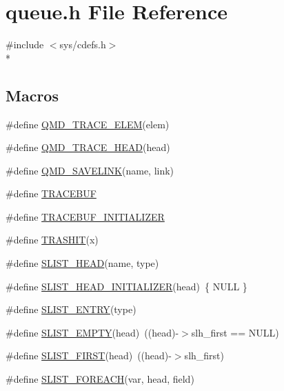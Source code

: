 \section{queue.\-h File Reference}
\label{queue_8h}
{\ttfamily \#include $<$sys/cdefs.\-h$>$}\\*
\subsection*{Macros}
\begin{DoxyCompactItemize}
\item 
\#define \hyperlink{queue_8h_a990f2617ebc37cd79c332e24ce7e4a88}{Q\-M\-D\-\_\-\-T\-R\-A\-C\-E\-\_\-\-E\-L\-E\-M}(elem)
\item 
\#define \hyperlink{queue_8h_af8813e6512e6ac86e6b598241b1bf020}{Q\-M\-D\-\_\-\-T\-R\-A\-C\-E\-\_\-\-H\-E\-A\-D}(head)
\item 
\#define \hyperlink{queue_8h_a96671a8f87ff87543b3b0b671a274a1c}{Q\-M\-D\-\_\-\-S\-A\-V\-E\-L\-I\-N\-K}(name, link)
\item 
\#define \hyperlink{queue_8h_a743488648fbd29bf4cf1addf004f43ef}{T\-R\-A\-C\-E\-B\-U\-F}
\item 
\#define \hyperlink{queue_8h_a0397af84b4a238c2b678721a88b6eccc}{T\-R\-A\-C\-E\-B\-U\-F\-\_\-\-I\-N\-I\-T\-I\-A\-L\-I\-Z\-E\-R}
\item 
\#define \hyperlink{queue_8h_adee7bf054da0ade68bb853732c665a2b}{T\-R\-A\-S\-H\-I\-T}(x)
\item 
\#define \hyperlink{queue_8h_a8224e40ea764bc857bab6f6d9c357dd9}{S\-L\-I\-S\-T\-\_\-\-H\-E\-A\-D}(name, type)
\item 
\#define \hyperlink{queue_8h_a9ae2aca3d46e62be4cb1408bd946ef15}{S\-L\-I\-S\-T\-\_\-\-H\-E\-A\-D\-\_\-\-I\-N\-I\-T\-I\-A\-L\-I\-Z\-E\-R}(head)~\{ N\-U\-L\-L \}
\item 
\#define \hyperlink{queue_8h_a5dd8bb1cef024ac008680e7e3b660332}{S\-L\-I\-S\-T\-\_\-\-E\-N\-T\-R\-Y}(type)
\item 
\#define \hyperlink{queue_8h_a59bcc4e6f4bf63b897bdc0644566c583}{S\-L\-I\-S\-T\-\_\-\-E\-M\-P\-T\-Y}(head)~((head)-\/$>$slh\-\_\-first == N\-U\-L\-L)
\item 
\#define \hyperlink{queue_8h_a91bac7d0d32e3ec56bc579ace45ed8cd}{S\-L\-I\-S\-T\-\_\-\-F\-I\-R\-S\-T}(head)~((head)-\/$>$slh\-\_\-first)
\item 
\#define \hyperlink{queue_8h_a05db87878125c27e3060dd641aa3b0f4}{S\-L\-I\-S\-T\-\_\-\-F\-O\-R\-E\-A\-C\-H}(var, head, field)
\item 

\end{DoxyCompactItemize}

